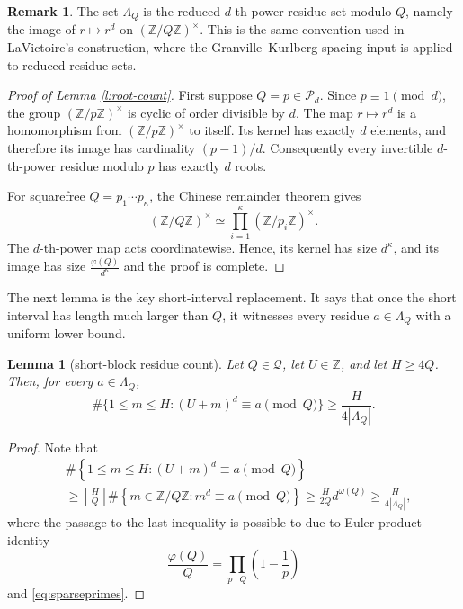 \documentclass[12pt,leqno]{amsart}
\def\Z {{\mathbb Z}}
\newcounter{counter}
\newcounter{counter2}
\numberwithin{equation}{section}
\numberwithin{counter2}{section}
\newcounter{theorem}
\newtheorem{lemma}[subsection]{Lemma}
\theoremstyle{definition}
\newtheorem{remark}[subsection]{Remark}
\theoremstyle{plain}
\newcommand{\floor}[1]{\left\lfloor #1 \right\rfloor}
\begin{document}
\begin{remark}
The set \(\Lambda_Q\) is the reduced \(d\)-th-power residue set modulo \(Q\),
namely the image of \(r\mapsto r^d\) on
\((\mathbb Z/Q\mathbb Z)^\times\). This is the same convention used in
LaVictoire's construction, where the Granville--Kurlberg spacing input is
applied to reduced residue sets.
\end{remark}


\begin{proof}[Proof of Lemma \ref{l:root-count}]
	First suppose $Q=p\in\mathcal P_d$. Since $p\equiv1\pmod d$, the group
	$(\mathbb Z/p\mathbb Z)^\times$ is cyclic of order divisible by $d$. The map $	r\mapsto r^d$ is a homomorphism from \((\mathbb Z/p\mathbb Z)^\times\) to itself. Its kernel
	has exactly \(d\) elements, and therefore its image has cardinality \((p-1)/d\).
	Consequently every invertible \(d\)-th-power residue modulo \(p\) has exactly
	\(d\) roots.
	
	For squarefree \(Q=p_1\cdots p_\kappa\), the Chinese remainder theorem gives
	\[
	(\mathbb Z/Q\mathbb Z)^\times
	\simeq
	\prod_{i=1}^{\kappa}(\mathbb Z/p_i\mathbb Z)^\times.
	\]
	The \(d\)-th-power map acts coordinatewise. Hence, its kernel has size
	\(d^\kappa\), and its image has size $
	\frac{\varphi(Q)}{d^\kappa}$
and the proof is complete.
\end{proof}The next lemma is the key short-interval replacement. It says that once the
short interval has length much larger than \(Q\), it witnesses every residue
\(a\in\Lambda_Q\) with a uniform lower bound.

\begin{lemma}[short-block residue count]\label{l:short-block-count}
Let \(Q\in\mathcal Q\), let \(U\in\mathbb Z\), and let \(H\geq 4Q\). Then,
for every \(a\in\Lambda_Q\),
\[
\#\{1\leq m\leq H:(U+m)^d\equiv a\pmod Q\}
\geq
\frac{H}{4|\Lambda_Q|}.
\]
\end{lemma}


\begin{proof}
Note that
 \[
\begin{split}
	 &\#\left\{1\leq m\leq H:(U+m)^d\equiv a\pmod Q\right \} \\
     & \geq \floor{\frac{H}{Q}} \# \left\{m \in \Z / Q \Z : m^d \equiv a \pmod{Q}\right\}   \geq \frac{H}{2Q}d^{\omega(Q)} \ge \frac{H}{4\left|\Lambda_Q\right|},
\end{split} \] where the passage to the last inequality is possible to due to  Euler product identity \[\frac{\varphi(Q)}{Q}=\prod_{p \mid Q} \left(1-\frac{1}{p}\right)\] and \eqref{eq:sparseprimes}.
\end{proof}
\end{document}
